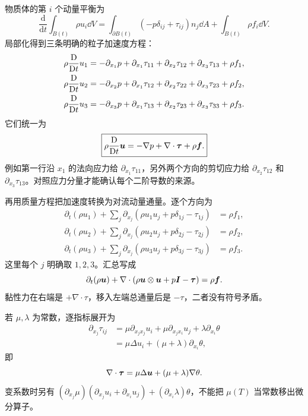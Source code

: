 物质体的第 $i$ 个动量平衡为
\begin{equation}
 \frac{\mathrm d}{\mathrm dt}\int_{B(t)}\rho u_i\dd V
 =\int_{\partial B(t)}(-p\delta_{ij}+\tau_{ij})n_j\dd A
 +\int_{B(t)}\rho f_i\dd V.
\end{equation}
局部化得到三条明确的粒子加速度方程：
\begin{align}
 \rho\frac{\mathrm D}{\mathrm Dt} u_1&=-\partial_{x_1}p+\partial_{x_1}\tau_{11}
 +\partial_{x_2}\tau_{12}+\partial_{x_3}\tau_{13}+\rho f_1,\\
 \rho\frac{\mathrm D}{\mathrm Dt} u_2&=-\partial_{x_2}p+\partial_{x_1}\tau_{12}
 +\partial_{x_2}\tau_{22}+\partial_{x_3}\tau_{23}+\rho f_2,\\
 \rho\frac{\mathrm D}{\mathrm Dt} u_3&=-\partial_{x_3}p+\partial_{x_1}\tau_{13}
 +\partial_{x_2}\tau_{23}+\partial_{x_3}\tau_{33}+\rho f_3.
\end{align}
它们统一为
\begin{equation}
 \boxed{\rho\frac{\mathrm D}{\mathrm Dt}\bm{u}=-\nabla p+\nabla\cdot\bm{\tau}+\rho\bm{f}.}
 \label{eq:cns-momentum-primitive}
\end{equation}
例如第一行沿 $x_1$ 的法向应力给 $\partial_{x_1}\tau_{11}$，另外两个方向的剪切应力给 $\partial_{x_2}\tau_{12}$ 和 $\partial_{x_3}\tau_{13}$。对照应力分量才能确认每个二阶导数的来源。

再用质量方程把加速度转换为对流动量通量。逐个方向为
\begin{align}
 \partial_t(\rho u_1)+\sum_j\partial_{x_j}(\rho u_1u_j+p\delta_{1j}-\tau_{1j})&=\rho f_1,\\
 \partial_t(\rho u_2)+\sum_j\partial_{x_j}(\rho u_2u_j+p\delta_{2j}-\tau_{2j})&=\rho f_2,\\
 \partial_t(\rho u_3)+\sum_j\partial_{x_j}(\rho u_3u_j+p\delta_{3j}-\tau_{3j})&=\rho f_3.
\end{align}
这里每个 $j$ 明确取 $1,2,3$。汇总写成
\begin{equation}
 \partial_t(\rho\bm{u})+\nabla\cdot(\rho\bm{u}\otimes\bm{u}+p\bm{I}-\bm{\tau})
 =\rho\bm{f}.\label{eq:cns-momentum-cons}
\end{equation}
黏性力在右端是 $+\nabla\cdot\tau$，移入左端总通量后是 $-\tau$，二者没有符号矛盾。

若 $\mu,\lambda$ 为常数，逐指标展开为
\begin{align}
 \partial_{x_j}\tau_{ij}
 &=\mu\partial_{x_jx_j}u_i+\mu\partial_{x_jx_i}u_j
 +\lambda\partial_{x_i}\theta\\
 &=\mu\Delta u_i+(\mu+\lambda)\partial_{x_i}\theta,
\end{align}
即
\begin{equation}
 \nabla\cdot\bm{\tau}=\mu\Delta\bm{u}+(\mu+\lambda)\nabla\theta.
 \label{eq:div-tau}
\end{equation}
变系数时另有 $(\partial_{x_j}\mu)(\partial_{x_j}u_i+\partial_{x_i}u_j)
 +(\partial_{x_i}\lambda)\theta$，不能把 $\mu(T)$ 当常数移出微分算子。

